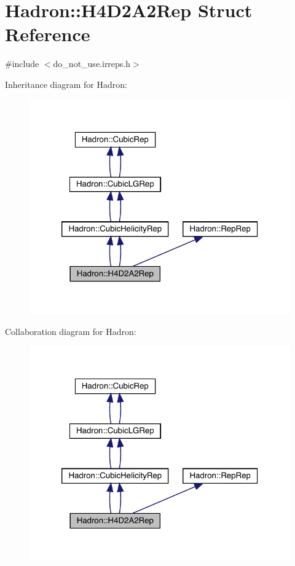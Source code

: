 \hypertarget{structHadron_1_1H4D2A2Rep}{}\section{Hadron\+:\+:H4\+D2\+A2\+Rep Struct Reference}
\label{structHadron_1_1H4D2A2Rep}


{\ttfamily \#include $<$do\+\_\+not\+\_\+use.\+irreps.\+h$>$}



Inheritance diagram for Hadron\+:\nopagebreak
\begin{figure}[H]
\begin{center}
\leavevmode
\includegraphics[width=320pt]{d8/dd6/structHadron_1_1H4D2A2Rep__inherit__graph}
\end{center}
\end{figure}


Collaboration diagram for Hadron\+:\nopagebreak
\begin{figure}[H]
\begin{center}
\leavevmode
\includegraphics[width=320pt]{de/d69/structHadron_1_1H4D2A2Rep__coll__graph}
\end{center}
\end{figure}
